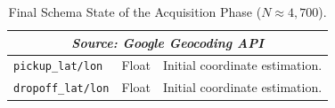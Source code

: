 \begin{table}[H]
\begin{tabularx}{\textwidth}{l l X}
        \midrule
        \multicolumn{3}{c}{\textit{Source: Google Geocoding API}} \\
        \midrule
        \texttt{pickup\_lat/lon} & Float & Initial coordinate estimation. \\
        \texttt{dropoff\_lat/lon} & Float & Initial coordinate estimation. \\
        \bottomrule
    \end{tabularx}
    \caption{Final Schema State of the Acquisition Phase ($N \approx 4,700$).}
    \label{tab:acquisition_schema}
\end{table}
